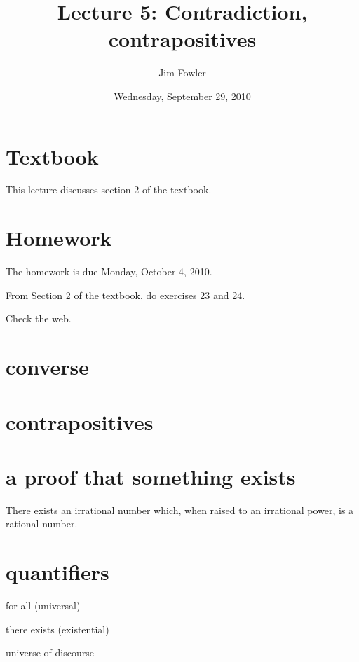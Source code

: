 \documentclass[12pt]{handout}
\title{Lecture 5: Contradiction, contrapositives}
\author{Jim Fowler}
\date{Wednesday, September 29, 2010}
\begin{document}
\maketitle

\section*{Textbook}

This lecture discusses section 2 of the textbook.

\section*{Homework} 


The homework is due Monday, October  4, 2010.


From Section 2 of the textbook, do exercises 23 and 24.

Check the web.

\section*{converse}

\section*{contrapositives}

\section*{a proof that something exists}

There exists an irrational number which, when raised to an irrational
power, is a rational number.

\section*{quantifiers}

for all (universal)
 
there exists (existential)

universe of discourse
\end{document}
